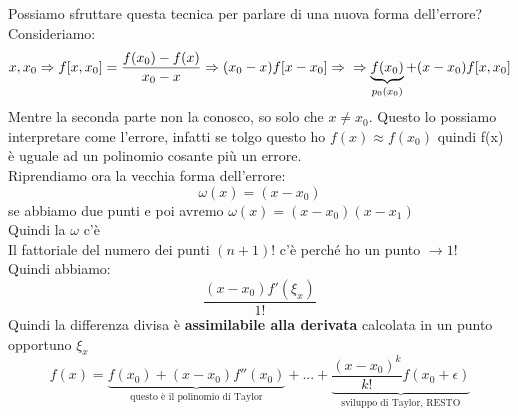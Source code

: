 \documentclass[a4paper, portrait]{book}
\numberwithin{equation}{chapter} %
\begin{document}
Possiamo sfruttare questa tecnica per parlare di una nuova forma dell'errore?\\
Consideriamo:
\begin{equation}
    x,x_0 \Rightarrow f[x,x_0] = \frac{f(x_0)-f(x)}{x_0-x} \Rightarrow (x_0-x)f[x-x_0] \Rightarrow\\
    \Rightarrow \underbrace{f(x_0)}_{p_0(x_0)}+(x-x_0)f[x,x_0]
\end{equation}
Mentre la seconda parte non la conosco, so solo che $x \neq x_0$. Questo lo possiamo interpretare come l'errore, infatti se tolgo questo ho $f(x) \approx f(x_0)$ quindi f(x) è uguale ad un polinomio cosante più un errore.\\
Riprendiamo ora la vecchia forma dell'errore:
\begin{equation}
    \omega(x) = (x-x_0)
\end{equation}
se abbiamo due punti e poi avremo $\omega(x) = (x-x_0)(x-x_1)$\\
Quindi la $\omega$ c'è\\
Il fattoriale del numero dei punti $(n+1)!$ c'è perché ho un punto $\rightarrow 1!$\\
Quindi abbiamo:
\begin{equation}
    \frac{(x-x_0)f'(\xi_x)}{1!}
\end{equation}
Quindi la differenza divisa è \textbf{assimilabile alla derivata} calcolata in un punto opportuno $\xi_x$
\begin{equation}
    f(x) = \underbrace{f(x_0)+(x-x_0)f''(x_0)}_{\text{questo è il polinomio di Taylor}} + ... + \underbrace{\frac{(x-x_0)^k}{k!}f(x_0+\epsilon)}_{\text{sviluppo di Taylor, RESTO}}
\end{equation}
\end{document}
